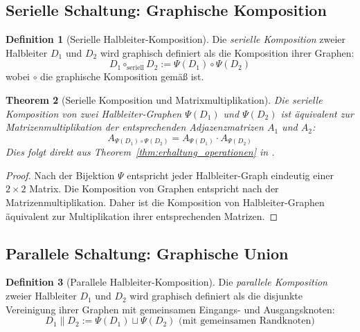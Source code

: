 \documentclass[12pt, a4paper]{article}
\newtheorem{theorem}{Theorem}[section]
\theoremstyle{definition}
\newtheorem{definition}[theorem]{Definition}
\theoremstyle{remark}
\begin{document}
\subsection{Serielle Schaltung: Graphische Komposition}
\label{subsec:serielle_komposition}

\begin{definition}[Serielle Halbleiter-Komposition]
\label{def:serielle_komposition}
Die \emph{serielle Komposition} zweier Halbleiter $D_1$ und $D_2$ wird graphisch definiert als die Komposition ihrer Graphen:
\[
  D_1 \circ_{\mathrm{seriell}} D_2 := \Psi(D_1) \circ \Psi(D_2)
\]
wobei $\circ$ die graphische Komposition gemäß \cite{epp2026matrgraph} ist.
\end{definition}

\begin{theorem}[Serielle Komposition und Matrixmultiplikation]
\label{thm:serielle_komposition_matrix}
Die serielle Komposition von zwei Halbleiter-Graphen $\Psi(D_1)$ und $\Psi(D_2)$ ist äquivalent zur Matrizenmultiplikation der entsprechenden Adjazenzmatrizen $A_1$ und $A_2$:
\[
  A_{\Psi(D_1) \circ \Psi(D_2)} = A_{\Psi(D_1)} \cdot A_{\Psi(D_2)}
\]
Dies folgt direkt aus Theorem~\ref{thm:erhaltung_operationen} in \cite{epp2026matrgraph}.
\end{theorem}

\begin{proof}
Nach der Bijektion $\Psi$ entspricht jeder Halbleiter-Graph eindeutig einer $2 \times 2$ Matrix. Die Komposition von Graphen entspricht nach \cite{epp2026matrgraph} der Matrizenmultiplikation. Daher ist die Komposition von Halbleiter-Graphen äquivalent zur Multiplikation ihrer entsprechenden Matrizen.
\end{proof}

\subsection{Parallele Schaltung: Graphische Union}
\label{subsec:parallele_komposition}

\begin{definition}[Parallele Halbleiter-Komposition]
\label{def:parallele_komposition}
Die \emph{parallele Komposition} zweier Halbleiter $D_1$ und $D_2$ wird graphisch definiert als die disjunkte Vereinigung ihrer Graphen mit gemeinsamen Eingangs- und Ausgangsknoten:
\[
  D_1 \parallel D_2 := \Psi(D_1) \sqcup \Psi(D_2) \text{ (mit gemeinsamen Randknoten)}
\]
\end{definition}
\end{document}
